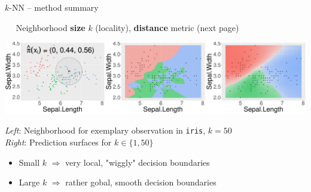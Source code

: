 \begin{frame}{$k$-NN -- method summary}

\vspace{1.5cm}

 ~~ Neighborhood \textbf{size} $k$ (locality), 
\textbf{distance} metric (next page)


\begin{minipage}{0.7\textwidth}
  \includegraphics[width=\textwidth]{figure/knn-neighborhood.pdf}
\end{minipage}%
\hfill
\begin{minipage}{0.25\textwidth}
  \tiny
  \raggedright
  \textit{Left}: Neighborhood for exemplary observation in \texttt{iris}, 
  $k = 50$ \\
  \textit{Right}: Prediction surfaces for $k \in \{1, 50\}$
\end{minipage}

\medskip

\begin{itemize}
    \item Small $k$ $\Rightarrow$ very local, "wiggly" decision boundaries
    \item Large $k$ $\Rightarrow$ rather gobal, smooth decision boundaries
\end{itemize}

\end{frame}


